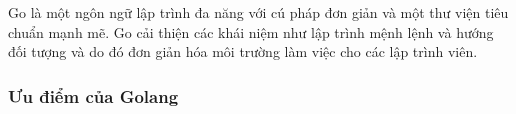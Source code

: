 Go là một ngôn ngữ lập trình đa năng với cú pháp đơn giản và một thư viện tiêu chuẩn mạnh mẽ. Go cải thiện các khái niệm như lập trình mệnh lệnh và hướng đối tượng và do đó đơn giản hóa môi trường làm việc cho các lập trình viên.

%
%
%
%
%
%
%
%

\subsubsection{Ưu điểm của Golang}

